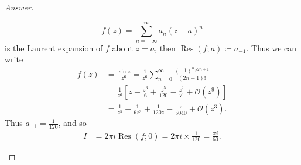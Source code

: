 \documentclass[12pt]{article}
\newcommand\paren[1]{\left( #1 \right)}
\newcommand{\sqbrack}[1]{\left [ #1 \right ]}
\theoremstyle{definition}
\DeclareMathOperator\Res{Res}
\begin{document}
\begin{proof}[Answer]
\begin{enumerate}[(a)]
        \[
            f(z) = \sum\limits_{n = -\infty}^{\infty} a_n (z-a)^n
        \]
        is the Laurent expansion of $f$ about $z = a$, then $\Res(f;a) \coloneqq a_{-1}$. Thus we can write
        \begin{align*}
            f(z) & = \frac{\sin z}{z^6} = \frac{1}{z^6} \sum\limits_{n = 0}^{\infty} \frac{(-1)^n z^{2n+1}}{(2n+1)!} \\
            & = \frac{1}{z^6} \sqbrack{ z - \frac{z^3}{6} + \frac{z^5}{120} - \frac{z^7}{7!} + \mathcal{O} \paren{ z^9 } } \\
            & = \frac{1}{z^5} - \frac{1}{6z^3} + \frac{1}{120z} - \frac{z}{5040} + \mathcal{O} \paren{ z^3 }.
        \end{align*}
        Thus $a_{-1} = \frac{1}{120}$, and so 
        \begin{align*}
            I & = 2\pi i \Res(f;0) = 2\pi i \times \frac{1}{120} = \boxed{ \frac{\pi i}{60} . }
        \end{align*}
    \end{enumerate}
\end{proof}
\end{document}
